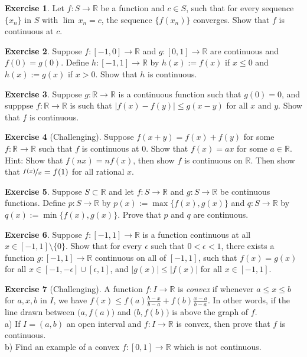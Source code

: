 \documentclass[12pt]{book}
\newcommand{\abs}[1]{\left\lvert {#1} \right\rvert}
\newcommand{\R}{{\mathbb{R}}}
\newcommand{\myindex}[1]{#1\index{#1}}
\theoremstyle{plain}
\theoremstyle{remark}
\theoremstyle{definition}
\theoremstyle{exercise}
\newtheorem{exercise}{Exercise}[section]
\theoremstyle{example}
\begin{document}
\begin{exercise} \label{exercise:contseqalt}
Let $f \colon S \to \R$ be a function and $c \in S$, such that for every
sequence $\{ x_n \}$ in $S$ with $\lim\, x_n = c$, the sequence
$\{ f(x_n) \}$ converges.  Show that $f$ is continuous at $c$.
\end{exercise}

\begin{exercise}
Suppose $f \colon [-1,0] \to \R$ and $g \colon [0,1] \to \R$ are continuous
and $f(0) = g(0)$.  Define $h \colon [-1,1] \to \R$ by 
$h(x) := f(x)$ if $x \leq 0$ and $h(x) := g(x)$ if $x > 0$.  Show that
$h$ is continuous.
\end{exercise}

\begin{exercise}
Suppose $g \colon \R \to \R$ is a continuous function such that $g(0) = 0$,
and supppse $f \colon \R \to \R$ is such that
$\abs{f(x)-f(y)} \leq g(x-y)$ for all $x$ and $y$.  Show that $f$ is
continuous.
\end{exercise}

\begin{exercise}[Challenging]
Suppose $f(x+y) = f(x) + f(y)$ for some $f \colon \R \to \R$
such that $f$ is continuous at 0.
Show that $f(x) = ax$ for some $a \in \R$.
Hint: Show that $f(nx) = nf(x)$, then show $f$ is continuous on $\R$.
Then show that $\nicefrac{f(x)}{x} = f(1)$ for all rational $x$.
\end{exercise}

\begin{exercise} \label{exercise:minmaxcont}
Suppose $S \subset \R$ and
let $f \colon S \to \R$ and
$g \colon S \to \R$ be continuous functions.
Define $p \colon S \to \R$ by
$p(x) := \max \{ f(x) , g(x) \}$ and
$q \colon S \to \R$ by
$q(x) := \min \{ f(x) , g(x) \}$.  Prove that $p$ and $q$ are
continuous.
\end{exercise}

\begin{exercise}
Suppose $f \colon [-1,1] \to \R$ is a function continuous at all $x \in
[-1,1] \setminus \{ 0 \}$.  Show that for every $\epsilon$ such
that $0 < \epsilon < 1$, there exists
a function $g \colon [-1,1] \to \R$ continuous on all of $[-1,1]$, such that
$f(x) = g(x)$ for all $x \in [-1,-\epsilon] \cup [\epsilon,1]$, and 
$\abs{g(x)} \leq \abs{f(x)}$ for all $x \in [-1,1]$.
\end{exercise}

\begin{exercise}[Challenging]
A function $f \colon I \to \R$ is \emph{\myindex{convex}} if
whenever $a \leq x \leq b$ for $a,x,b$ in $I$, we have
$f(x) \leq f(a) \frac{b-x}{b-a} + f(b) \frac{x-a}{b-a}$.  In other words,
if the line drawn between $\bigl(a,f(a)\bigr)$ and $\bigl(b,f(b)\bigr)$ 
is above the graph of $f$.\\
a) If $I = (a,b)$ an open interval and $f \colon I \to \R$ is convex,
then prove that $f$ is continuous.
\\
b) Find an example of a convex $f \colon [0,1] \to \R$ which is
not continuous.
\end{exercise}
\end{document}

